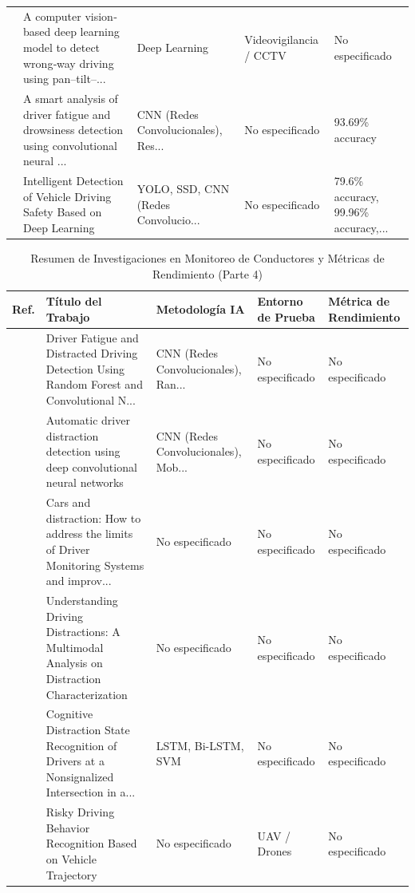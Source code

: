 \begin{table}[htbp]
\begin{tabular}{cp{7.5cm}p{2.8cm}p{2.8cm}p{2.8cm}}
\cite{haghighat2022computer} & A computer vision‐based deep learning model to detect wrong‐way driving using pan–tilt–... & Deep Learning & Videovigilancia / CCTV & No especificado \\
\cite{minhas2022smart} & A smart analysis of driver fatigue and drowsiness detection using convolutional neural ... & CNN (Redes Convolucionales), Res... & No especificado & 93.69\% accuracy \\
\cite{wang2022intelligent} & Intelligent Detection of Vehicle Driving Safety Based on Deep Learning & YOLO, SSD, CNN (Redes Convolucio... & No especificado & 79.6\% accuracy, 99.96\% accuracy,... \\
\bottomrule
\end{tabular}
\end{table}


\begin{table}[htbp]
\centering
\renewcommand{\arraystretch}{1.1}
\caption{Resumen de Investigaciones en Monitoreo de Conductores y Métricas de Rendimiento (Parte 4)}
\label{tab:articulos_conductores_4}
\footnotesize
\begin{tabular}{cp{7.5cm}p{2.8cm}p{2.8cm}p{2.8cm}}
\toprule
\textbf{Ref.} & \textbf{Título del Trabajo} & \textbf{Metodología IA} & \textbf{Entorno de Prueba} & \textbf{Métrica de Rendimiento} \\
\midrule
\cite{dong2022fatigue} & Driver Fatigue and Distracted Driving Detection Using Random Forest and Convolutional N... & CNN (Redes Convolucionales), Ran... & No especificado & No especificado \\
\cite{hossain2022automatic} & Automatic driver distraction detection using deep convolutional neural networks & CNN (Redes Convolucionales), Mob... & No especificado & No especificado \\
\cite{jannusch2021cars} & Cars and distraction: How to address the limits of Driver Monitoring Systems and improv... & No especificado & No especificado & No especificado \\
\cite{papakostas2021understanding} & Understanding Driving Distractions: A Multimodal Analysis on Distraction Characterization & No especificado & No especificado & No especificado \\
\cite{hua2021cognitive} & Cognitive Distraction State Recognition of Drivers at a Nonsignalized Intersection in a... & LSTM, Bi-LSTM, SVM & No especificado & No especificado \\
\cite{chen2021risky} & Risky Driving Behavior Recognition Based on Vehicle Trajectory & No especificado & UAV / Drones & No especificado \\

\end{tabular}
\end{table}
